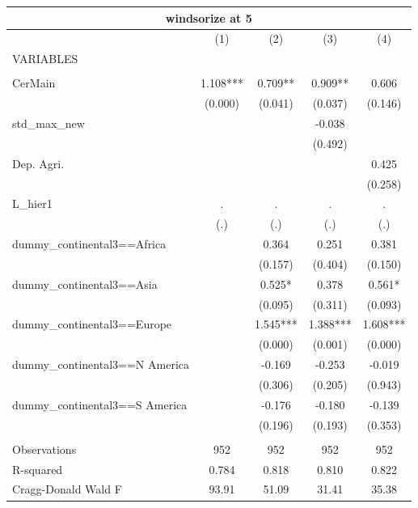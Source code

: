 \begin{tabular}{lcccc}
\multicolumn{5}{c}{windsorize at 5} \\ \hline
 & (1) & (2) & (3) & (4) \\
VARIABLES &  &  &  &  \\ \hline
 &  &  &  &  \\
CerMain & 1.108*** & 0.709** & 0.909** & 0.606 \\
 & (0.000) & (0.041) & (0.037) & (0.146) \\
std\_max\_new &  &  & -0.038 &  \\
 &  &  & (0.492) &  \\
Dep. Agri. &  &  &  & 0.425 \\
 &  &  &  & (0.258) \\
L\_hier1 & . & . & . & . \\
 & (.) & (.) & (.) & (.) \\
dummy\_continental3==Africa &  & 0.364 & 0.251 & 0.381 \\
 &  & (0.157) & (0.404) & (0.150) \\
dummy\_continental3==Asia &  & 0.525* & 0.378 & 0.561* \\
 &  & (0.095) & (0.311) & (0.093) \\
dummy\_continental3==Europe &  & 1.545*** & 1.388*** & 1.608*** \\
 &  & (0.000) & (0.001) & (0.000) \\
dummy\_continental3==N America &  & -0.169 & -0.253 & -0.019 \\
 &  & (0.306) & (0.205) & (0.943) \\
dummy\_continental3==S America &  & -0.176 & -0.180 & -0.139 \\
 &  & (0.196) & (0.193) & (0.353) \\
 &  &  &  &  \\
Observations & 952 & 952 & 952 & 952 \\
R-squared & 0.784 & 0.818 & 0.810 & 0.822 \\
 Cragg-Donald Wald F & 93.91 & 51.09 & 31.41 & 35.38 \\ \hline
\end{tabular}
